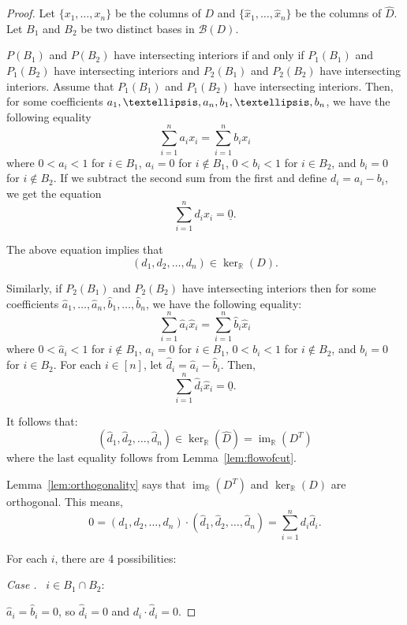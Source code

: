 \documentclass[10pt,a4paper]{amsart}
\theoremstyle{definition}
\newcounter{cdrthm}
\newenvironment{enonce}[2][remark]{\refstepcounter{cdrthm}\par\medskip\noindent\textit{#2 \thecdrthm.}\ }{\par}
\newcommand{\un}{\underline}
\newcommand{\R}{\mathbb{R}}
\newcommand{\B}{\mathcal{B}}
\newcommand{\col}[1]{x_{#1}}
\newcommand{\hcol}[1]{\widehat x_{#1}}
\DeclareMathOperator{\Ima}{im}
\begin{document}
\begin{proof}
Let $\{\col 1,\dots, \col n\}$ be the columns of $D$ and $\{\hcol 1,\dots, \hcol n\}$ be the columns of $\widehat D$. Let $B_1$ and $B_2$ be two distinct bases in $\B(D)$. 

$P(B_1)$ and $P(B_2)$ have intersecting interiors if and only if $P_1(B_1)$ and $P_1(B_2)$ have intersecting interiors and $P_2(B_1)$ and $P_2(B_2)$ have intersecting interiors. Assume that $P_1(B_1)$ and $P_1(B_2)$ have intersecting interiors. Then, for some coefficients $a_1,\dots,a_{n},\\
b_1,\dots,b_{n}$, we have the following equality
\[
\sum_{i=1}^{n} a_i \col i = \sum_{i=1}^{n} b_i \col i
\]
where $0 < a_i < 1$ for $i \in B_1$, $a_i = 0$ for $i \not\in B_1$, $0 < b_i < 1$ for $i \in B_2$, and $b_i =0 $ for $i \not\in B_2$. If we subtract the second sum from the first and define $d_i = a_i - b_i$, we get the equation
\[
\sum_{i=1}^{n} d_i \col i=\un 0.
\]

The above equation implies that
\[
(d_1,d_2,\dots,d_n)\in \ker_\mathbb R (D).
\]

Similarly, if $P_2(B_1)$ and $P_2(B_2)$ have intersecting interiors then for some coefficients $\widehat a_1,\dots,\widehat a_{n},
\widehat b_1,\dots,\widehat b_{n}$, we have the following equality:
\[
\sum_{i=1}^{n} \widehat a_i\hcol i = \sum_{i=1}^{n} \widehat b_i\hcol i
\]
where $0 < \widehat a_i <1$ for $i \not\in B_1$, $a_i = 0$ for $i \in B_1$, $0 < b_i < 1$ for $i \not\in B_2$, and $b_i =0 $ for $i \in B_2$. For each $i \in [n]$, let $\widehat d_i = \widehat a_i - \widehat b_i$. Then,
\[
\sum_{i=1}^{n} \widehat d_i\hcol i=\un 0.
\]

It follows that:
\[
(\widehat d_1,\widehat d_2,\dots,\widehat d_n)\in \ker_\mathbb R (\widehat D) = \Ima_\R(D^T)
\]
where the last equality follows from Lemma~\ref{lem:flowofcut}.

Lemma~\ref{lem:orthogonality} says that $\Ima_\R(D^T)$ and $\ker_\R(D)$ are orthogonal. This means,
\[
0 = (d_1,d_2,\dots,d_n) \cdot(\widehat d_1,\widehat d_2,\dots,\widehat d_n) = \sum_{i=1}^{n} d_i\widehat d_i.
\]

For each $i$, there are 4 possibilities:

\begingroup
\setcounter{cdrthm}{0}
\renewcommand\thecdrthm{}

\begin{enonce}[remark]{Case}\label{proof_def5.7_cas1} $i \in B_1 \cap B_2$:

$\widehat a_i = \widehat b_i = 0$, so $\widehat d_i = 0$ and $d_i \cdot \widehat d_i = 0$. 
\end{enonce}


\end{proof}
\end{document}
